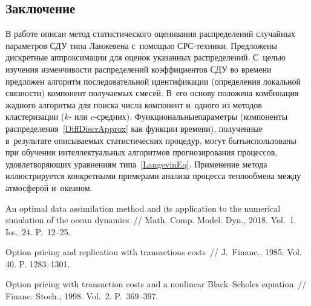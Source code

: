\begin{multicols}{2}
\vspace*{-9pt}

\section{Заключение}
\vspace*{-3pt}

В работе описан метод статистического оценивания 
распределений случайных па\-ра\-мет\-ров СДУ
типа Ланжевена с~по\-мощью СРС-техники.
Предложены дискретные аппроксимации для оценок указанных распределений. 
С~целью изучения из\-мен\-чи\-вости распределений коэффициентов СДУ 
во времени пред\-ло\-жен алгоритм последовательной идентификации 
(определения локальной связ\-ности) компонент получаемых смесей. 
В~его основу положена комбинация жад\-но\-го алгоритма для поиска чис\-ла 
компонент и~одного из методов клас\-те\-ри\-за\-ции ($k$- или $c$-сред\-них). 
Функциональные\linebreak па\-ра\-мет\-ры (компоненты распределения~\eqref{DiffDiscrApprox} 
как функции времени), полученные в~результате опи\-сы\-ва\-емых статистических 
процедур, могут быть\linebreak использованы при обучении интеллектуальных 
алгоритмов прогнозирования процессов, удовле\-тво\-ря\-ющих уравнениям 
типа~\eqref{LangevinEq}. Применение метода иллюстрируется конкретными 
примерами анализа процесса теп\-ло\-об\-ме\-на между атмосферой и~океаном.

\vspace*{-9pt}

{\small\frenchspacing
 {%
\vspace*{-3pt}


 \begin{thebibliography}{99}
An optimal data assimilation method and its application 
to the numerical simulation of the ocean dynamics~// 
Math. Comp. Model. Dyn., 2018. Vol.~1. Iss.~24. P.~12--25.

 Option pricing and replication with transactions costs~// 
J.~Financ., 1985. Vol. 40. P. 1283--1301.

 Option pricing with transaction 
costs and a nonlinear Black--Scholes equation~// 
Financ. Stoch., 1998. Vol.~2. P.~369--397.


\end{thebibliography}}}
\end{multicols}
